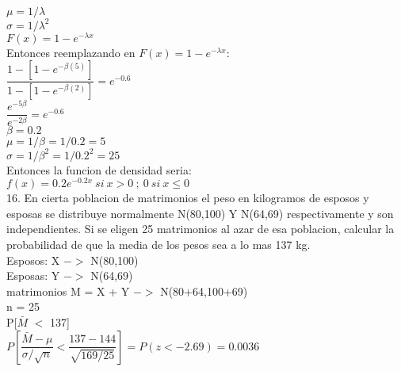 \documentclass[12 pt,letterpaper]{article}
\begin{document}
\hspace{-0.7cm}$\mu = 1/ \lambda$\\[2ex]
$\sigma = 1/ \lambda^2$\\[2ex]
$F(x) = 1-e^{-\lambda x}$\\[2ex]

\hspace{-0.7cm}Entonces reemplazando en $F(x) = 1-e^{-\lambda x}$:\\[2ex]

\hspace{-0.7cm}$\dfrac{1-[1-e^{- \beta (5)}]}{1-[1-e^{- \beta (2)}]} = e^{-0.6}$\\[2ex]
$\dfrac{e^{-5 \beta}}{e^{-2 \beta}} = e^{-0.6}$\\[2ex]

\hspace{-0.7cm}$\beta = 0.2$\\[2ex]
$\mu = 1/\beta = 1/0.2 = 5$\\[2ex]
$\sigma = 1/ \beta ^2 = 1/0.2^2 = 25$\\[2ex]

\hspace{-0.7cm}Entonces la funcion de densidad seria:\\[2ex]

\hspace{-0.7cm}$f(x) = 0.2e^{-0.2x} \ si \  x > 0 \  ; \  0 \  si \  x \le 0 $\\[10ex]

\hspace{-0.7cm}16. En cierta poblacion de matrimonios el peso en kilogramos de esposos y esposas se distribuye normalmente N(80,100) Y N(64,69) respectivamente y son independientes. Si se eligen 25 matrimonios al azar de esa poblacion, calcular la probabilidad de que la media de los pesos sea a lo mas 137 kg.\\[2ex]

\hspace{-0.7cm}Esposos: X $->$ N(80,100)\\[1ex]
Esposas: Y $->$ N(64,69)\\[1ex]
matrimonios M = X + Y $->$ N(80+64,100+69)\\[1ex]
n = 25\\[1ex]
P[$\bar{M}$ $<$ 137]\\[1ex]
$P[\dfrac{\bar{M} - \mu}{\sigma / \sqrt{n}} < \dfrac{137-144}{\sqrt{169/25}}] = P(z < -2.69) = 0.0036 $\\[2ex]
\end{document}
